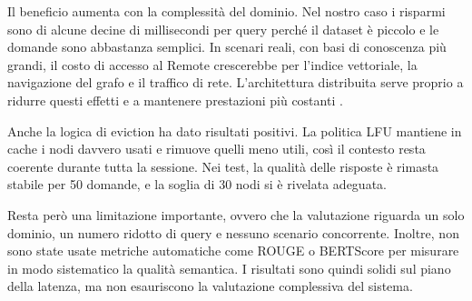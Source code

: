 Il beneficio aumenta con la complessità del dominio. Nel nostro caso i risparmi sono di alcune decine di millisecondi per query perché il dataset è piccolo e le domande sono abbastanza semplici. In scenari reali, con basi di conoscenza più grandi, il costo di accesso al Remote crescerebbe per l'indice vettoriale, la navigazione del grafo e il traffico di rete. L'architettura distribuita serve proprio a ridurre questi effetti e a mantenere prestazioni più costanti \cite{rag_performance_2023}.

Anche la logica di eviction ha dato risultati positivi. La politica LFU mantiene in cache i nodi davvero usati e rimuove quelli meno utili, così il contesto resta coerente durante tutta la sessione. Nei test, la qualità delle risposte è rimasta stabile per 50 domande, e la soglia di 30 nodi si è rivelata adeguata.

Resta però una limitazione importante, ovvero che la valutazione riguarda un solo dominio, un numero ridotto di query e nessuno scenario concorrente. Inoltre, non sono state usate metriche automatiche come ROUGE o BERTScore per misurare in modo sistematico la qualità semantica. I risultati sono quindi solidi sul piano della latenza, ma non esauriscono la valutazione complessiva del sistema.